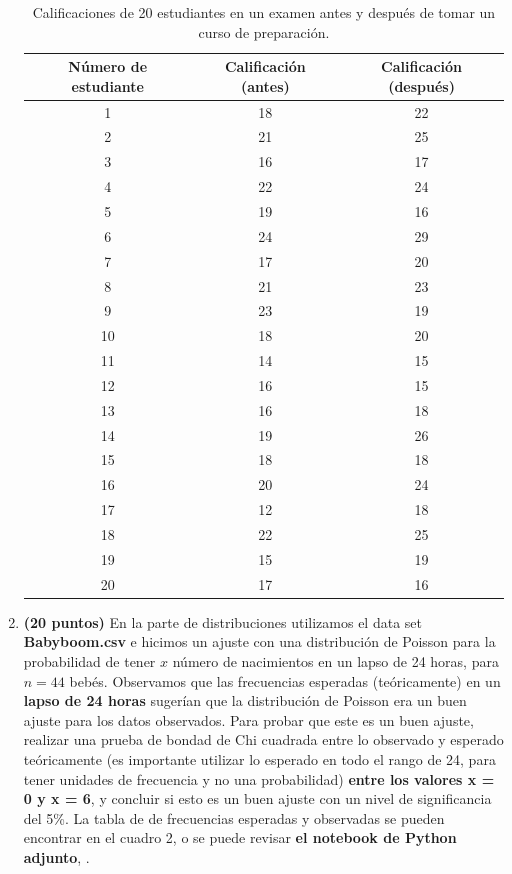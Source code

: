 \documentclass{article}
\begin{document}
\begin{enumerate}
\begin{table}[h!]
\centering
\begin{tabular}{ | c | c | c |} \hline
 Número de estudiante & Calificación (antes) & Calificación (después) \\ \hline 
 1 & 18 & 22 \\  
 2 & 21 & 25 \\
 3 & 16 & 17 \\  
 4 & 22 & 24 \\
 5 & 19 & 16 \\  
 6 & 24 & 29 \\
 7 & 17 & 20 \\  
 8 & 21 & 23 \\
 9 & 23 & 19 \\  
 10 & 18 & 20 \\
 11 & 14 & 15 \\  
 12 & 16 & 15 \\ 
 13 & 16 & 18 \\  
 14 & 19 & 26 \\
 15 & 18 & 18 \\  
16 & 20 & 24 \\
17 & 12 & 18 \\  
18 & 22 & 25 \\
19 & 15 & 19 \\  
20 & 17 & 16 \\  \hline
\end{tabular}
\label{Table1}
\caption{Calificaciones de 20 estudiantes en un examen antes y después de tomar un curso de preparación.}
\end{table}


\item \textbf{(20 puntos)} En la parte de distribuciones utilizamos el data set \textbf{Babyboom.csv} e hicimos un ajuste con una distribución de Poisson para la probabilidad de tener $x$ número de nacimientos en un lapso de 24 horas, para $n=44$ bebés. Observamos que las frecuencias esperadas (teóricamente) en un \textbf{lapso de 24 horas} sugerían que la distribución de Poisson era un buen ajuste para los datos observados. Para probar que este es un buen ajuste, realizar una prueba de bondad de Chi cuadrada entre lo observado y esperado teóricamente (es importante utilizar lo esperado en todo el rango de 24, para tener unidades de frecuencia y no una probabilidad) \textbf{entre los valores x = 0 y x = 6}, y concluir si esto es un buen ajuste con un nivel de significancia del 5\%. La tabla de de frecuencias esperadas y observadas se pueden encontrar en el cuadro 2, o se puede revisar \textbf{el notebook de Python adjunto}, .


\end{enumerate}
\end{document}
